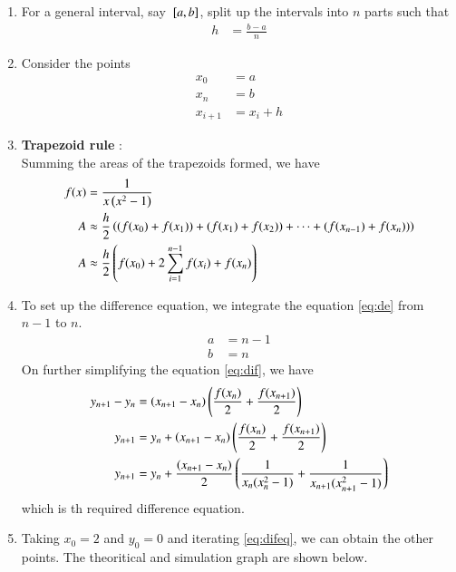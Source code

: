 \documentclass[journal]{IEEEtran}
\begin{document}
\begin{enumerate}
\item For a general interval, say ${}\left[a,b\right]$, split up the intervals into $n$ parts such that
\begin{align}
	h &= \frac{b-a}{n} \label{eq:split}
\end{align}
\item Consider the points 
\begin{align}
	x_{0} &= a \\
	x_{n} &= b \\
	x_{i+1} &= x_{i} + h
\end{align}
\item \textbf{Trapezoid rule} : \\
Summing the areas of the trapezoids formed, we have
\begin{align}
	f(x) &= \frac{1}{x \left(x^2 - 1\right)} \\
	A &\approx \frac{h}{2} \left((f(x_{0}) + f(x_{1})) + (f(x_{1}) + f(x_{2})) + \dots + (f(x_{n-1}) + f(x_{n}))\right) \\
	A &\approx \frac{h}{2} \left(f(x_{0}) + 2 \sum_{i=1}^{n-1} f(x_{i}) + f(x_{n}) \right) \label{eq:dif}
\end{align}
\item To set up the difference equation, we integrate the equation \eqref{eq:de} from $n-1$ to $n$.
	\begin{align}
		a &= n-1 \\
		b &= n
	\end{align}
		On further simplifying the equation \eqref{eq:dif}, we have
		\begin{align}
			y_{n+1} - y_{n} &= \left(x_{n+1} - x_{n}\right) \left(\frac{f(x_{n})}{2} + \frac{f(x_{n+1})}{2}\right) \\
			y_{n+1} &= y_{n} + \left(x_{n+1} - x_{n}\right) \left(\frac{f(x_{n})}{2} + \frac{f(x_{n+1})}{2}\right) \\
			y_{n+1} &= y_{n} + \frac{\left(x_{n+1} - x_{n}\right)}{2} \left(\frac{1}{x_{n}(x_{n}^2 - 1)} + \frac{1}{x_{n+1}(x_{n+1}^2 - 1)}\right) \label{eq:difeq} 
		\end{align}
		which is th required difference equation.
	\item Taking $x_0 = 2$ and $y_0 = 0$ and iterating \eqref{eq:difeq}, we can obtain the other points. The theoritical and simulation graph are shown below.
		\begin{figure}[h]
			\centering

\end{figure}
\end{enumerate}
\end{document}
